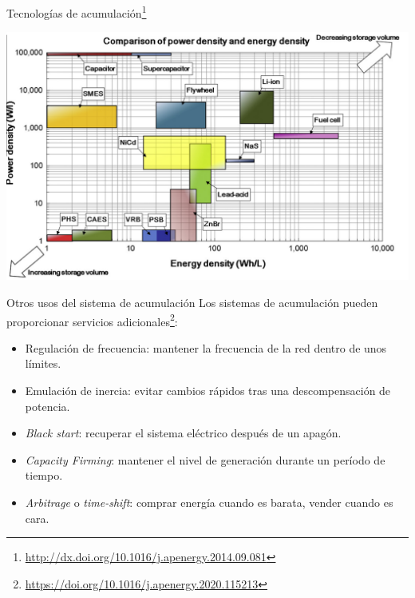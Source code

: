 \documentclass[aspectratio=169, usenames,svgnames,dvipsnames]{beamer}
\begin{document}
\begin{frame}[label={sec:org2ef52c0}]{Tecnologías de acumulación\footnote{\url{http://dx.doi.org/10.1016/j.apenergy.2014.09.081}}}
\begin{center}
\includegraphics[height=0.8\textheight]{../figs/SistemasAcumulacion_DensidadPotenciaEnergia.png}
\end{center}
\end{frame}

\begin{frame}[label={sec:org56a8f00}]{Otros usos del sistema de acumulación}
Los sistemas de acumulación pueden proporcionar servicios adicionales\footnote{\url{https://doi.org/10.1016/j.apenergy.2020.115213}}:

\begin{itemize}
\item Regulación de frecuencia: mantener la frecuencia de la red dentro de unos límites.
\item Emulación de inercia: evitar cambios rápidos tras una descompensación de potencia.
\item \emph{Black start}: recuperar el sistema eléctrico después de un apagón.
\item \emph{Capacity Firming}: mantener el nivel de generación durante un período de tiempo.
\item \emph{Arbitrage} o \emph{time-shift}: comprar energía cuando es barata, vender cuando es cara.
\end{itemize}
\end{frame}
\end{document}
